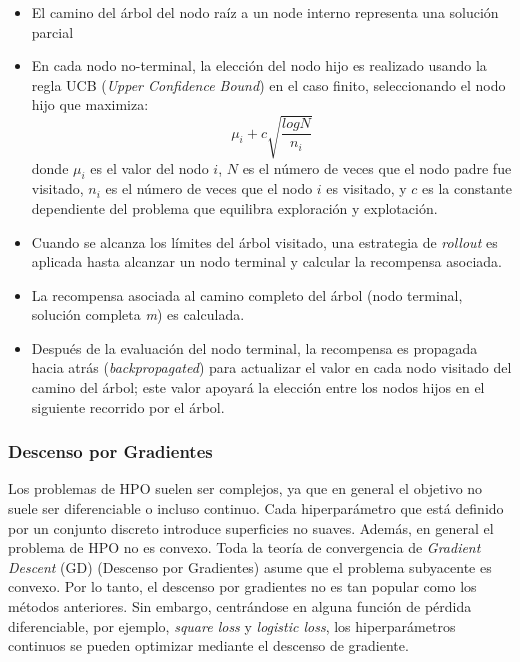 \begin{itemize}
	\item El camino del árbol del nodo raíz a un node interno representa una solución parcial
	\item  En cada nodo no-terminal, la elección del nodo hijo es realizado usando la regla UCB (\textit{Upper Confidence Bound}) en el caso finito, seleccionando el nodo hijo que maximiza: 
	$$
	 \mu_i + c\sqrt{\frac{logN}{n_i}}
	$$
	donde $\mu_i$  es el valor del nodo $i$, $N$ es el número de veces que el nodo padre fue visitado, $n_i$ es el número de veces que el nodo $i$ es visitado, y $c$ es la constante dependiente del problema que equilibra exploración y explotación.
	\item Cuando se alcanza los límites del árbol visitado, una estrategia de \textit{rollout} es aplicada hasta alcanzar un nodo terminal y calcular la recompensa asociada.
	\item La recompensa asociada al camino completo del árbol (nodo terminal, solución completa \textit{m}) es calculada.
	\item Después de la evaluación del nodo terminal, la recompensa es propagada hacia atrás (\textit{backpropagated}) para actualizar el valor en cada nodo visitado del camino del árbol; este valor apoyará la elección entre los nodos hijos en el siguiente recorrido por el árbol.
\end{itemize}

\subsubsection{Descenso por Gradientes}


Los problemas de HPO suelen ser complejos, ya que en general el objetivo no suele ser diferenciable o incluso continuo. Cada hiperparámetro que está definido por un conjunto discreto introduce superficies no suaves. Además, en general el problema de HPO no es convexo. Toda la teoría de convergencia de \textit{Gradient Descent} (GD) (Descenso por Gradientes) asume que el problema subyacente es convexo. Por lo tanto, el descenso por gradientes no es tan popular como los métodos anteriores. Sin embargo, centrándose en alguna función de pérdida diferenciable, por ejemplo, \textit{square loss} y \textit{logistic loss}, los hiperparámetros continuos se pueden optimizar mediante el descenso de gradiente.


